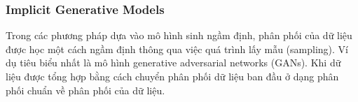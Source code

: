 \subsubsection{Implicit Generative Models}

Trong các phương pháp dựa vào mô hình sinh ngầm định, phân phối của dữ liệu được học một cách ngầm định thông qua việc quá trình lấy mẫu (sampling). Ví dụ tiêu biểu nhất là mô hình generative adversarial networks (GANs). Khi dữ liệu được tổng hợp bằng cách chuyển phân phối dữ liệu ban đầu ở dạng phân phối chuẩn về phân phối của dữ liệu.

%

